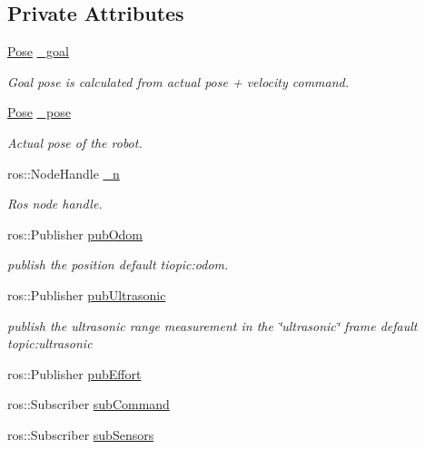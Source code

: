 \subsection*{Private Attributes}
\begin{DoxyCompactItemize}
\item 
\hyperlink{structControl_1_1Pose}{Pose} \hyperlink{classControl_a55028ed5b7ee32c69282a3e51a7d63f1}{\-\_\-goal}
\begin{DoxyCompactList}\small\item\em Goal pose is calculated from actual pose + velocity command. \end{DoxyCompactList}\item 
\hyperlink{structControl_1_1Pose}{Pose} \hyperlink{classControl_a5aaf886a6c03a01a66b1d692ee0194ae}{\-\_\-pose}
\begin{DoxyCompactList}\small\item\em Actual pose of the robot. \end{DoxyCompactList}\item 
ros\-::\-Node\-Handle \hyperlink{classControl_a535634dd1aa6331c1da87a3da4800fac}{\-\_\-n}
\begin{DoxyCompactList}\small\item\em Ros node handle. \end{DoxyCompactList}\item 
ros\-::\-Publisher \hyperlink{classControl_ae82077fb676becf3f23fd0d87b5b818c}{pub\-Odom}
\begin{DoxyCompactList}\small\item\em publish the position default tiopic\-:odom. \end{DoxyCompactList}\item 
ros\-::\-Publisher \hyperlink{classControl_a9e46e0589c03e37f3ade64d617e2d89c}{pub\-Ultrasonic}
\begin{DoxyCompactList}\small\item\em publish the ultrasonic range measurement in the \char`\"{}ultrasonic\char`\"{} frame default topic\-:ultrasonic \end{DoxyCompactList}\item 
ros\-::\-Publisher \hyperlink{classControl_a3aaa95c82a13bc4d25aa983ec875f31f}{pub\-Effort}
\item 
ros\-::\-Subscriber \hyperlink{classControl_a497d6d472f41ae3e087e8d7ea4c79e7c}{sub\-Command}
\item 
ros\-::\-Subscriber \hyperlink{classControl_af489d55663df41604322747fe6209c17}{sub\-Sensors}
\item 

\end{DoxyCompactItemize}
